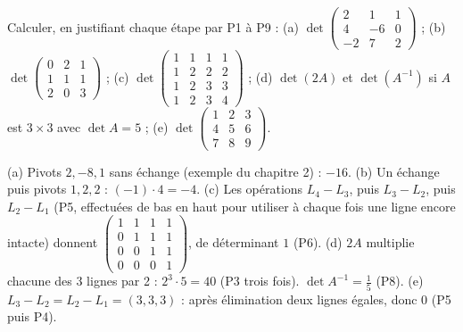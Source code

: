 \begin{exo}
Calculer, en justifiant chaque étape par P1 à P9 :
(a) $\det\begin{pmatrix}2&1&1\\4&-6&0\\-2&7&2\end{pmatrix}$ ; (b) $\det\begin{pmatrix}0&2&1\\1&1&1\\2&0&3\end{pmatrix}$ ; (c) $\det\begin{pmatrix}1&1&1&1\\1&2&2&2\\1&2&3&3\\1&2&3&4\end{pmatrix}$ ; (d) $\det(2A)$ et $\det(A^{-1})$ si $A$ est $3\times3$ avec $\det A=5$ ; (e) $\det\begin{pmatrix}1&2&3\\4&5&6\\7&8&9\end{pmatrix}$.
\begin{corrige}
(a) Pivots $2,-8,1$ sans échange (exemple du chapitre 2) : $-16$. (b) Un échange puis pivots $1,2,2$ : $(-1)\cdot4=-4$. (c) Les opérations $L_4-L_3$, puis $L_3-L_2$, puis $L_2-L_1$ (P5, effectuées de bas en haut pour utiliser à chaque fois une ligne encore intacte) donnent $\begin{pmatrix}1&1&1&1\\0&1&1&1\\0&0&1&1\\0&0&0&1\end{pmatrix}$, de déterminant $1$ (P6). (d) $2A$ multiplie chacune des 3 lignes par 2 : $2^3\cdot5=40$ (P3 trois fois). $\det A^{-1}=\frac15$ (P8). (e) $L_3-L_2=L_2-L_1=(3,3,3)$ : après élimination deux lignes égales, donc $0$ (P5 puis P4).
\end{corrige}
\end{exo}
